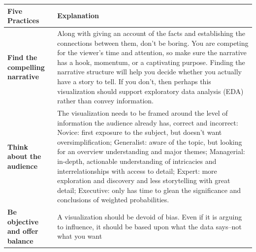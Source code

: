 \documentclass[]{book}
\theoremstyle{definition}
\theoremstyle{definition}
\theoremstyle{definition}
\theoremstyle{remark}
\begin{document}
\begin{longtable}[]{@{}ll@{}}
\toprule
\begin{minipage}[b]{0.19\columnwidth}\raggedright\strut
\textbf{Five Practices}\strut
\end{minipage} & \begin{minipage}[b]{0.75\columnwidth}\raggedright\strut
\textbf{Explanation}\strut
\end{minipage}\tabularnewline
\midrule
\endhead
\begin{minipage}[t]{0.19\columnwidth}\raggedright\strut
\textbf{Find the compelling narrative}\strut
\end{minipage} & \begin{minipage}[t]{0.75\columnwidth}\raggedright\strut
Along with giving an account of the facts and establishing the
connections between them, don't be boring. You are competing for the
viewer's time and attention, so make sure the narrative has a hook,
momentum, or a captivating purpose. Finding the narrative structure will
help you decide whether you actually have a story to tell. If you don't,
then perhaps this visualization should support exploratory data analysis
(EDA) rather than convey information.\strut
\end{minipage}\tabularnewline
\begin{minipage}[t]{0.19\columnwidth}\raggedright\strut
\textbf{Think about the audience}\strut
\end{minipage} & \begin{minipage}[t]{0.75\columnwidth}\raggedright\strut
The visualization needs to be framed around the level of information the
audience already has, correct and incorrect: Novice: first exposure to
the subject, but doesn't want oversimplification; Generalist: aware of
the topic, but looking for an overview understanding and major themes;
Managerial: in-depth, actionable understanding of intricacies and
interrelationships with access to detail; Expert: more exploration and
discovery and less storytelling with great detail; Executive: only has
time to glean the significance and conclusions of weighted
probabilities.\strut
\end{minipage}\tabularnewline
\begin{minipage}[t]{0.19\columnwidth}\raggedright\strut
\textbf{Be objective and offer balance}\strut
\end{minipage} & \begin{minipage}[t]{0.75\columnwidth}\raggedright\strut
A visualization should be devoid of bias. Even if it is arguing to
influence, it should be based upon what the data says--not what you want

\end{minipage}
\end{longtable}
\end{document}
